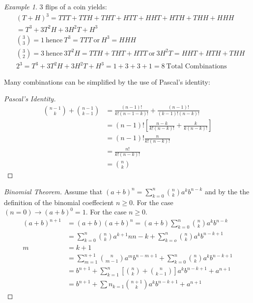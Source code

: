 \documentclass{article}
\theoremstyle{plain}
\theoremstyle{definition}
\theoremstyle{remark}
\newtheorem{example}{Example}
\begin{document}
\begin{example}
  3 flips of a coin yields:
  \begin{align*}
  &(T + H)^3 = TTT + TTH + THT + HTT + HHT+ HTH + THH + HHH \\
  &= T^3 + 3T^2H + 3H^2T + H^3 \\
  &\binom{3}{3} = 1\ \text{hence}\ T^3 = TTT\ \text{or}\ H^3 = HHH \\
  &\binom{3}{2} = 3\ \text{hence}\ 3T^2H = TTH + THT + HTT\ \text{or}\ 3H^2T = HHT+HTH+THH \\
  & 2^3 = T^3 + 3T^2H + 3H^2T + H^3 = 1 + 3 + 3 + 1 = 8\ \text{Total Combinations}
  \end{align*}
\end{example}
Many combinations can be simplified by the use of Pascal's identity:
\begin{proof}[Pascal's Identity]
  \begin{align*}
    \binom{n - 1}{k} + \binom{n - 1}{k - 1} &= \frac{(n-1)!}{k!(n - 1 - k)!} + \frac{(n - 1)!}{(k-1)!(n-k)!} \\
    &= (n - 1)![\frac{n-k}{k!(n-k)!} + \frac{k}{k(n-k)!}] \\
    &= (n - 1)!\frac{n}{k!(n-k)!} \\
    &= \frac{n!}{k!(n - k)!} \\
    &= \binom{n}{k}
  \end{align*}
\end{proof}
\begin{proof}[Binomial Theorem]
  Assume that $(a + b)^n = \sum_{k=0}^{n} \binom{n}{k} a^kb^{n-k}$ and by the the definition of the binomial coeffecient $n \geq 0$. For the case $(n = 0) \to (a + b)^0 = 1$. For the case $n \ge 0$.
  \begin{align*}
    (a + b)^{n+1} &= (a + b)(a + b)^n = (a+b)\sum_{k=0}^{n}\binom{n}{k}a^kb^{n-k} \\
                  &= \sum^{n}_{k=0}\binom{n}{k}a^{k+1}n{n-k} + \sum^{n}_{k=o}\binom{n}{k}a^{k}b^{n-k+1} \\
    m &= k + 1 \\
                  &= \sum^{n+1}_{m=1}\binom{n}{m-1}a^{m}b^{n-m+1}+\sum^{n}_{k=0}\binom{n}{k}a^{k}b^{n-k+1} \\
                  &= b^{n+1}+\sum^{n}_{k=1}[\binom{n}{k} + \binom{n}{k-1}]a^kb^{n-k+1}+a^{n+1}\\
                  &= b^{n+1}+\sum{n}_{k=1}\binom{n+1}{k}a^{k}b^{n-k+1}+a^{n+1}
  \end{align*}
\end{proof}
\end{document}
